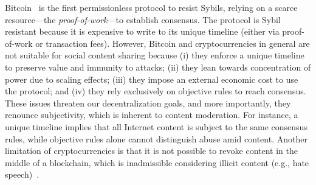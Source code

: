 \documentclass[12pt]{article}
\begin{document}
Bitcoin~\cite{p2p.bitcoin} is the first permissionless protocol to resist
Sybils, relying on a scarce resource---the \emph{proof-of-work}---to establish
consensus.
The protocol is Sybil resistant because it is expensive to write to its
unique timeline (either via proof-of-work or transaction fees).
%
However, Bitcoin and cryptocurrencies in general are not suitable for social
content sharing because
    (i)   they enforce a unique timeline to preserve value and immunity to
          attacks;
    (ii)  they lean towards concentration of power due to scaling effects;
    (iii) they impose an external economic cost to use the protocol; and
    (iv)  they rely exclusively on objective rules to reach consensus.
%
These issues threaten our decentralization goals, and more importantly, they
renounce subjectivity, which is inherent to content moderation.
%
For instance, a unique timeline implies that all Internet content is subject
to the same consensus rules, while objective rules alone cannot distinguish
abuse amid content.
%
Another limitation of cryptocurrencies is that it is not possible to revoke
content in the middle of a blockchain, which is inadmissible considering
illicit content (e.g., hate speech)~\cite{btc.content}.
\end{document}
